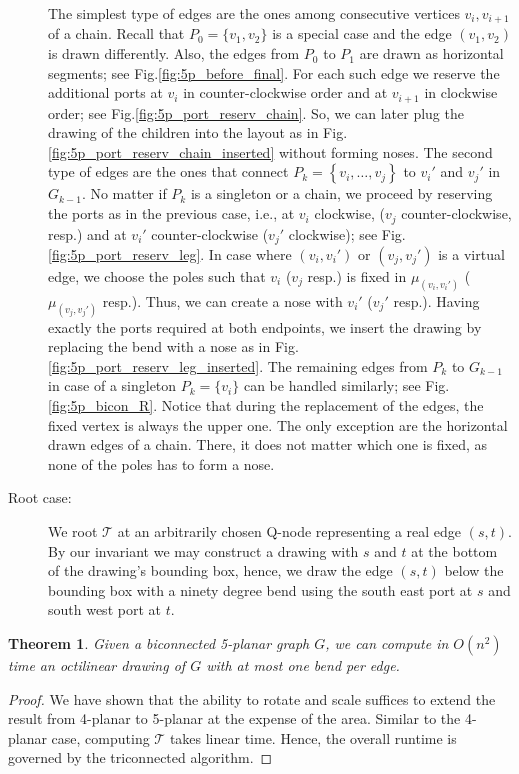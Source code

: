 \documentclass[a4paper,twoside,11pt]{article}
\newtheorem{theorem}{Theorem}
\begin{document}
\begin{description}
The simplest type of edges are the ones among consecutive vertices
$v_i, v_{i+1}$ of a chain. Recall that $P_0 = \{ v_1, v_2 \} $ is a
special case and the edge $(v_1, v_2)$ is drawn differently. Also,
the edges from $P_0$ to $P_1$ are drawn as horizontal segments; see
Fig.\ref{fig:5p_before_final}. For each such edge we reserve the
additional ports at $v_i$ in counter-clockwise order and at
$v_{i+1}$ in clockwise order; see
Fig.\ref{fig:5p_port_reserv_chain}. So, we can later plug the
drawing of the children into the layout as in
Fig.\ref{fig:5p_port_reserv_chain_inserted} without forming noses.
The second type of edges are the ones that connect $P_k =
\left\{v_i,\ldots,v_j\right\}$ to $v_{i}'$  and $v_{j}'$ in
$G_{k-1}$. No matter if $P_k$ is a singleton or a chain, we proceed
by reserving the ports as in the previous case, i.e., at $v_i$
clockwise, ($v_j$ counter-clockwise, resp.) and at $v_{i}'$
counter-clockwise ($v_{j}'$ clockwise); see
Fig.\ref{fig:5p_port_reserv_leg}. In case where $(v_i, v_{i}')$ or
$(v_j, v_{j}')$ is a virtual edge, we choose the poles such that
$v_i$ ($v_j $ resp.) is fixed in $\mu_{(v_i, v_{i}')}$ ($\mu_{(v_j,
v_{j}')}$ resp.). Thus, we can create a nose with $v_{i}'$ ($v_{j}'$
resp.). Having exactly the ports required at both endpoints, we
insert the drawing by replacing the bend with a nose as in
Fig.\ref{fig:5p_port_reserv_leg_inserted}. The remaining edges from
$P_k$ to $G_{k-1}$ in case of a singleton $P_k = \{ v_i \}$ can be
handled similarly; see Fig.\ref{fig:5p_bicon_R}. Notice that during
the replacement of the edges, the fixed vertex is always the upper
one. The only exception are the horizontal drawn edges of a chain.
There, it does not matter which one is fixed, as none of the poles
has to form a nose.
\item[Root case:] We root $\mathcal{T}$ at an arbitrarily chosen
Q-node representing a real edge $(s,t)$. By our invariant we may
construct a drawing with $s$ and $t$ at the bottom of the drawing's
bounding box, hence, we draw the edge $(s,t)$ below the bounding box
with a ninety degree bend using the south east port at $s$ and south
west port at $t$.
\end{description}

\begin{theorem}
Given a biconnected 5-planar graph $G$, we can compute in $O(n^2)$
time an octilinear drawing of $G$ with at most one bend per edge.
\end{theorem}
\begin{proof}
We have shown that the ability to rotate and scale suffices to
extend the result from 4-planar to 5-planar at the expense of the
area. Similar to the 4-planar case, computing $\mathcal{T}$ takes
linear time. Hence, the overall runtime is governed by the
triconnected algorithm.
\end{proof}
\end{document}
